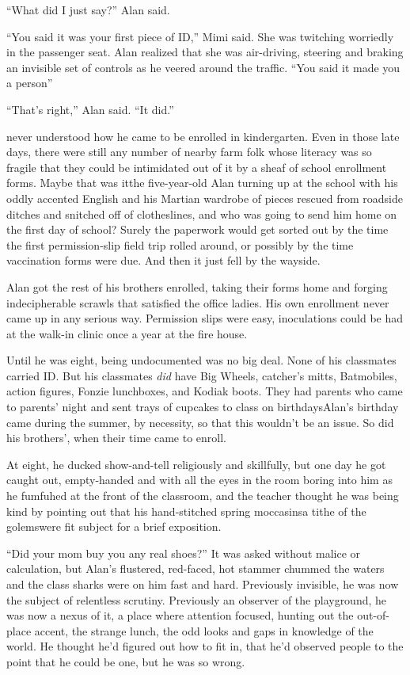 ``What did I just say?'' Alan said.

``You said it was your first piece of ID,'' Mimi said.  She was
twitching worriedly in the passenger seat.  Alan realized that she was
air-driving, steering and braking an invisible set of controls as he
veered around the traffic.  ``You said it made you a person\dash{}''

``That's right,'' Alan said.  ``It did.''

 never understood how he came to be enrolled in kindergarten.  Even
in those late days, there were still any number of nearby farm folk
whose literacy was so fragile that they could be intimidated out of it
by a sheaf of school enrollment forms.  Maybe that was it\dash{}the
five-year-old Alan turning up at the school with his oddly accented
English and his Martian wardrobe of pieces rescued from roadside
ditches and snitched off of clotheslines, and who was going to send
him home on the first day of school?  Surely the paperwork would get
sorted out by the time the first permission-slip field trip rolled
around, or possibly by the time vaccination forms were due.  And then
it just fell by the wayside.

Alan got the rest of his brothers enrolled, taking their forms home
and forging indecipherable scrawls that satisfied the office ladies. 
His own enrollment never came up in any serious way.  Permission slips
were easy, inoculations could be had at the walk-in clinic once a year
at the fire house.

Until he was eight, being undocumented was no big deal.  None of his
classmates carried ID.  But his classmates \textit{did} have Big
Wheels, catcher's mitts, Batmobiles, action figures, Fonzie
lunchboxes, and Kodiak boots.  They had parents who came to parents'
night and sent trays of cupcakes to class on birthdays\dash{}Alan's
birthday came during the summer, by necessity, so that this wouldn't
be an issue.  So did his brothers', when their time came to enroll.

At eight, he ducked show-and-tell religiously and skillfully, but one
day he got caught out, empty-handed and with all the eyes in the room
boring into him as he fumfuhed at the front of the classroom, and the
teacher thought he was being kind by pointing out that his
hand-stitched spring moccasins\dash{}a tithe of the golems\dash{}were fit
subject for a brief exposition.

``Did your mom buy you any real shoes?'' It was asked without malice
or calculation, but Alan's flustered, red-faced, hot stammer chummed
the waters and the class sharks were on him fast and hard.  Previously
invisible, he was now the subject of relentless scrutiny.  Previously
an observer of the playground, he was now a nexus of it, a place where
attention focused, hunting out the out-of-place accent, the strange
lunch, the odd looks and gaps in knowledge of the world.  He thought
he'd figured out how to fit in, that he'd observed people to the point
that he could be one, but he was so wrong.

